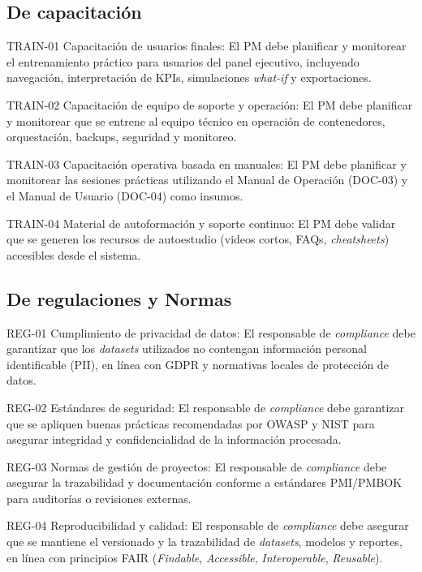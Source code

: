 \documentclass[12pt]
{charter}
\begin{document}
\subsection{De capacitación}
\begin{description}
  \item TRAIN-01 Capacitación de usuarios finales: El PM debe planificar y monitorear el entrenamiento práctico para usuarios del panel ejecutivo, incluyendo navegación, interpretación de KPIs, simulaciones \textit{what-if} y exportaciones.

  \item TRAIN-02 Capacitación de equipo de soporte y operación: El PM debe planificar y monitorear que se entrene al equipo técnico en operación de contenedores, orquestación, backups, seguridad y monitoreo.

  \item TRAIN-03 Capacitación operativa basada en manuales: El PM debe planificar y monitorear las sesiones prácticas utilizando el Manual de Operación (DOC-03) y el Manual de Usuario (DOC-04) como insumos.

  \item TRAIN-04 Material de autoformación y soporte continuo: El PM debe validar que se generen los recursos de autoestudio (videos cortos, FAQs, \textit{cheatsheets}) accesibles desde el sistema.

\end{description}

\subsection{De regulaciones y Normas}
\begin{description}
  \item REG-01 Cumplimiento de privacidad de datos: El responsable de \textit{compliance} debe garantizar que los \textit{datasets} utilizados no contengan información personal identificable (PII), en línea con GDPR y normativas locales de protección de datos.

  \item REG-02 Estándares de seguridad: El responsable de \textit{compliance} debe garantizar que se apliquen buenas prácticas recomendadas por OWASP y NIST para asegurar integridad y confidencialidad de la información procesada.

  \item REG-03 Normas de gestión de proyectos: El responsable de \textit{compliance} debe asegurar la trazabilidad y documentación conforme a estándares PMI/PMBOK para auditorías o revisiones externas.

  \item REG-04 Reproducibilidad y calidad: El responsable de \textit{compliance} debe asegurar que se mantiene el versionado y la trazabilidad de \textit{datasets}, modelos y reportes, en línea con principios FAIR (\textit{Findable}, \textit{Accessible}, \textit{Interoperable}, \textit{Reusable}).

\end{description}
\end{document}
